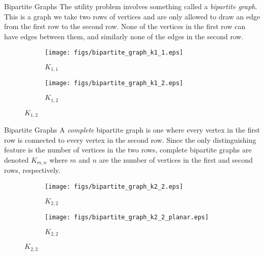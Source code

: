 \documentclass{beamer}
\begin{document}
    \begin{frame}{Bipartite Graphs}
        The utility problem involves something called a
        \textit{bipartite graph}. This is a graph we take
        two rows of vertices and are only allowed to draw an
        edge from the first row to the second row. None of the
        vertices in the first row can have edges between them,
        and similarly none of the edges in the second row.
        \begin{figure}
            \centering
            \begin{subfigure}[b]{0.49\textwidth}
                \centering
                \texttt{[image: figs/bipartite\_graph\_k1\_1.eps]}
                \caption{$K_{1,1}$}
                \label{fig:bipartite_graph_k1_1}
            \end{subfigure}
            \hfill
            \begin{subfigure}[b]{0.49\textwidth}
                \centering
                \texttt{[image: figs/bipartite\_graph\_k1\_2.eps]}
                \caption{$K_{1,2}$}
                \label{fig:bipartite_graph_k1_2}
            \end{subfigure}
        \end{figure}
    \end{frame}
    \begin{frame}{Bipartite Graphs}
        A \textit{complete} bipartite graph is one where every
        vertex in the first row is connected to every vertex in
        the second row. Since the only distinguishing feature is the
        number of vertices in the two rows, complete bipartite graphs
        are denoted $K_{m,n}$ where $m$ and $n$ are the number of
        vertices in the first and second rows, respectively.
        \begin{figure}
            \centering
            \begin{subfigure}[b]{0.49\textwidth}
                \centering
                \texttt{[image: figs/bipartite\_graph\_k2\_2.eps]}
                \caption{$K_{2,2}$}
                \label{fig:bipartite_graph_k2_2}
            \end{subfigure}
            \hfill
            \begin{subfigure}[b]{0.49\textwidth}
                \centering
                \texttt{[image: figs/bipartite\_graph\_k2\_2\_planar.eps]}
                \caption{$K_{2,2}$}
                \label{fig:bipartite_graph_k2_2_planar}
            \end{subfigure}
        \end{figure}
    \end{frame}
\end{document}
